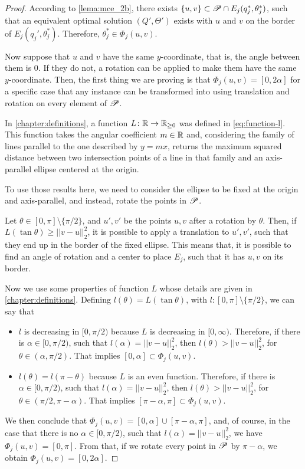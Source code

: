 \begin{proof}
	According to \autoref{lema:mce_2b}, there exists $\{u, v\} \subset \mathscr{P} \cap E_j(q^*_j, \theta^*_j)$, such that an equivalent optimal solution $(Q', \Theta')$ exists with $u$ and $v$ on the border of $E_j(q_j', \theta_j^*)$. Therefore, $\theta_j^*\in\Phi_j(u,v)$.
	
	Now suppose that $u$ and $v$ have the same $y$-coordinate, that is, the angle between them is $0$. If they do not, a rotation can be applied to make them have the same $y$-coordinate. Then, the first thing we are proving is that $\Phi_j(u, v) = [0, 2\alpha]$ for a specific case that any instance can be transformed into using translation and rotation on every element of $\mathscr{P}$.
	
	In \autoref{chapter:definitions}, a function $L\colon \mathbb{R} \to \mathbb{R}_{\ge0}$ was defined in \autoref{eq:function-l}. This function takes the angular coefficient $m\in\mathbb{R}$ and, considering the family of lines parallel to the one described by $y=mx$, returns the maximum squared distance between two intersection points of a line in that family and an axis-parallel ellipse centered at the origin.
	
	To use those results here, we need to consider the ellipse to be fixed at the origin and axis-parallel, and instead, rotate the points in $\mathscr{P}$. 
	
	Let $\theta \in [0, \pi]\setminus\{\pi/2\}$, and $u', v'$ be the points $u, v$ after a rotation by $\theta$. Then, if $L(\tan{\theta}) \ge ||v-u||_2^2$, it is possible to apply a translation to $u',v'$, such that they end up in the border of the fixed ellipse. This means that, it is possible to find an angle of rotation and a center to place $E_j$, such that it has $u, v$ on its border. 
	
	Now we use some properties of function $L$ whose details are given in \autoref{chapter:definitions}.
	Defining $l(\theta)=L(\tan{\theta})$, with $l:[0, \pi]\setminus\{\pi/2\}$, we can say that
	
	\begin{itemize}
		\item $l$ is decreasing in $[0, \pi/2)$ because $L$ is decreasing in $[0, \infty)$. Therefore, if there is $\alpha\in[0, \pi/2)$, such that $l(\alpha) = ||v-u||_2^2$, then $l(\theta)>||v-u||_2^2$, for $\theta\in(\alpha, \pi/2)$. That implies $[0, \alpha] \subset \Phi_j(u,v)$.
		\item $l(\theta) = l(\pi-\theta)$ because $L$ is an even function. Therefore, if there is $\alpha\in[0, \pi/2)$, such that $l(\alpha) = ||v-u||_2^2$, then $l(\theta)>||v-u||_2^2$, for $\theta\in(\pi/2,\pi-\alpha)$. That implies $[\pi-\alpha, \pi] \subset \Phi_j(u,v)$.
	\end{itemize}
	We then conclude that $\Phi_j(u, v) = [0, \alpha]\cup [\pi-\alpha, \pi]$, and, of course, in the case that there is no $\alpha\in[0, \pi/2)$, such that $l(\alpha)=||v-u||_2^2$, we have $\Phi_j(u,v)=[0, \pi]$.
	From that, if we rotate every point in $\mathscr{P}$ by $\pi-\alpha$, we obtain $\Phi_j(u,v)=[0, 2\alpha]$.
	

\end{proof}
